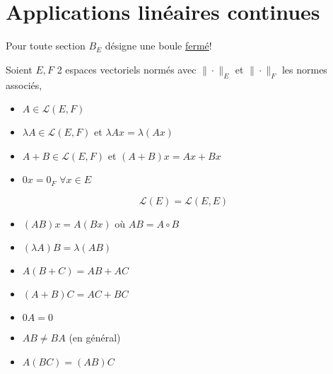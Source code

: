\documentclass[a4paper]{report}
\theoremstyle{definition}
\begin{document}
\section{Applications linéaires continues}
Pour toute section $B_E$ désigne une boule \underline{fermé}!
\par
Soient $E, F$ 2 espaces vectoriels normés avec  $\| \cdot \|_{E}$ et $\| \cdot \|_{F}$ les normes associés, 
\begin{itemize}
    \item $A \in \mathcal{L}(E, F)$
    \item $\lambda A \in \mathcal{L}(E, F)$ et $\lambda Ax = \lambda(Ax)$
    \item  $A + B \in \mathcal{L}(E, F)$ et $(A + B)x = Ax + Bx$
    \item  $0x = 0_F$  $\forall x \in E$
\end{itemize}
\[
    \mathcal{L}(E) = \mathcal{L}(E, E)
\] 
\begin{itemize}
    \item $(AB)x = A(Bx)$ où  $AB = A \circ B$
    \item  $(\lambda A)B = \lambda (AB)$
    \item  $A(B + C) = AB + AC$
    \item  $(A + B)C = AC + BC$
    \item  $0A = 0$ 
    \item $AB \neq BA$ (en général)
    \item $A(BC) = (AB)C$
\end{itemize}
\end{document}

